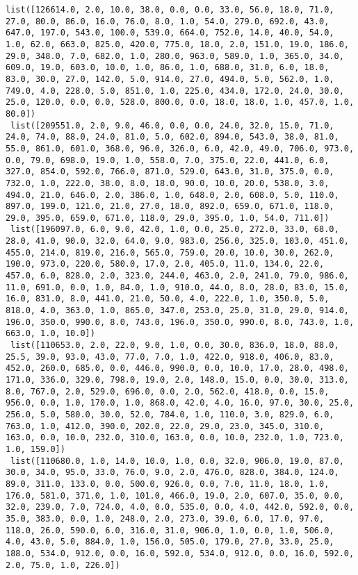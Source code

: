 \documentclass[11pt]{article}
\begin{document}
\begin{Verbatim}[commandchars=\\\{\}]
 list([126614.0, 2.0, 10.0, 38.0, 0.0, 0.0, 33.0, 56.0, 18.0, 71.0, 27.0, 80.0, 86.0, 16.0, 76.0, 8.0, 1.0, 54.0, 279.0, 692.0, 43.0, 647.0, 197.0, 543.0, 100.0, 539.0, 664.0, 752.0, 14.0, 40.0, 54.0, 1.0, 62.0, 663.0, 825.0, 420.0, 775.0, 18.0, 2.0, 151.0, 19.0, 186.0, 29.0, 348.0, 7.0, 682.0, 1.0, 280.0, 963.0, 589.0, 1.0, 365.0, 34.0, 609.0, 19.0, 603.0, 10.0, 1.0, 86.0, 1.0, 688.0, 31.0, 6.0, 18.0, 83.0, 30.0, 27.0, 142.0, 5.0, 914.0, 27.0, 494.0, 5.0, 562.0, 1.0, 749.0, 4.0, 228.0, 5.0, 851.0, 1.0, 225.0, 434.0, 172.0, 24.0, 30.0, 25.0, 120.0, 0.0, 0.0, 528.0, 800.0, 0.0, 18.0, 18.0, 1.0, 457.0, 1.0, 80.0])
 list([209551.0, 2.0, 9.0, 46.0, 0.0, 0.0, 24.0, 32.0, 15.0, 71.0, 24.0, 74.0, 88.0, 24.0, 81.0, 5.0, 602.0, 894.0, 543.0, 38.0, 81.0, 55.0, 861.0, 601.0, 368.0, 96.0, 326.0, 6.0, 42.0, 49.0, 706.0, 973.0, 0.0, 79.0, 698.0, 19.0, 1.0, 558.0, 7.0, 375.0, 22.0, 441.0, 6.0, 327.0, 854.0, 592.0, 766.0, 871.0, 529.0, 643.0, 31.0, 375.0, 0.0, 732.0, 1.0, 222.0, 38.0, 8.0, 18.0, 90.0, 10.0, 20.0, 538.0, 3.0, 494.0, 21.0, 646.0, 2.0, 386.0, 1.0, 648.0, 2.0, 608.0, 5.0, 110.0, 897.0, 199.0, 121.0, 21.0, 27.0, 18.0, 892.0, 659.0, 671.0, 118.0, 29.0, 395.0, 659.0, 671.0, 118.0, 29.0, 395.0, 1.0, 54.0, 711.0])
 list([196097.0, 6.0, 9.0, 42.0, 1.0, 0.0, 25.0, 272.0, 33.0, 68.0, 28.0, 41.0, 90.0, 32.0, 64.0, 9.0, 983.0, 256.0, 325.0, 103.0, 451.0, 455.0, 214.0, 819.0, 216.0, 565.0, 759.0, 20.0, 10.0, 30.0, 262.0, 190.0, 973.0, 220.0, 580.0, 17.0, 2.0, 405.0, 11.0, 134.0, 22.0, 457.0, 6.0, 828.0, 2.0, 323.0, 244.0, 463.0, 2.0, 241.0, 79.0, 986.0, 11.0, 691.0, 0.0, 1.0, 84.0, 1.0, 910.0, 44.0, 8.0, 28.0, 83.0, 15.0, 16.0, 831.0, 8.0, 441.0, 21.0, 50.0, 4.0, 222.0, 1.0, 350.0, 5.0, 818.0, 4.0, 363.0, 1.0, 865.0, 347.0, 253.0, 25.0, 31.0, 29.0, 914.0, 196.0, 350.0, 990.0, 8.0, 743.0, 196.0, 350.0, 990.0, 8.0, 743.0, 1.0, 663.0, 1.0, 10.0])
 list([110653.0, 2.0, 22.0, 9.0, 1.0, 0.0, 30.0, 836.0, 18.0, 88.0, 25.5, 39.0, 93.0, 43.0, 77.0, 7.0, 1.0, 422.0, 918.0, 406.0, 83.0, 452.0, 260.0, 685.0, 0.0, 446.0, 990.0, 0.0, 10.0, 17.0, 28.0, 498.0, 171.0, 336.0, 329.0, 798.0, 19.0, 2.0, 148.0, 15.0, 0.0, 30.0, 313.0, 8.0, 767.0, 2.0, 529.0, 696.0, 0.0, 2.0, 562.0, 418.0, 0.0, 15.0, 956.0, 0.0, 1.0, 170.0, 1.0, 868.0, 42.0, 4.0, 16.0, 97.0, 30.0, 25.0, 256.0, 5.0, 580.0, 30.0, 52.0, 784.0, 1.0, 110.0, 3.0, 829.0, 6.0, 763.0, 1.0, 412.0, 390.0, 202.0, 22.0, 29.0, 23.0, 345.0, 310.0, 163.0, 0.0, 10.0, 232.0, 310.0, 163.0, 0.0, 10.0, 232.0, 1.0, 723.0, 1.0, 159.0])
 list([110680.0, 1.0, 14.0, 10.0, 1.0, 0.0, 32.0, 906.0, 19.0, 87.0, 30.0, 34.0, 95.0, 33.0, 76.0, 9.0, 2.0, 476.0, 828.0, 384.0, 124.0, 89.0, 311.0, 133.0, 0.0, 500.0, 926.0, 0.0, 7.0, 11.0, 18.0, 1.0, 176.0, 581.0, 371.0, 1.0, 101.0, 466.0, 19.0, 2.0, 607.0, 35.0, 0.0, 32.0, 239.0, 7.0, 724.0, 4.0, 0.0, 535.0, 0.0, 4.0, 442.0, 592.0, 0.0, 35.0, 383.0, 0.0, 1.0, 248.0, 2.0, 273.0, 39.0, 6.0, 17.0, 97.0, 118.0, 26.0, 590.0, 6.0, 316.0, 31.0, 906.0, 1.0, 0.0, 1.0, 506.0, 4.0, 43.0, 5.0, 884.0, 1.0, 156.0, 505.0, 179.0, 27.0, 33.0, 25.0, 188.0, 534.0, 912.0, 0.0, 16.0, 592.0, 534.0, 912.0, 0.0, 16.0, 592.0, 2.0, 75.0, 1.0, 226.0])

\end{Verbatim}
\end{document}
